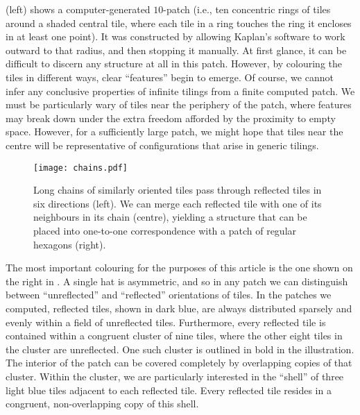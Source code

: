  (left) shows a computer-generated $10$-patch 
(i.e., ten concentric rings of tiles around a shaded central tile,
where each tile in a ring touches the ring it encloses in at least one 
point).  It was constructed by allowing Kaplan's software to work outward to
that radius, and then stopping it manually.
At first glance, it can be difficult to discern any
structure at all in this patch.  However, by colouring the tiles in different
ways, clear ``features'' begin to emerge.  Of course, we cannot infer any
conclusive properties of infinite tilings from a finite computed patch.
We must be particularly wary of tiles near the periphery of the patch,
where features may break down under the extra freedom afforded by
the proximity to empty space.  However, for a sufficiently large patch,
we might hope that tiles near the centre will be representative of 
configurations that arise in generic tilings.

\begin{figure}[htp!]
\begin{center}
\texttt{[image: chains.pdf]}
\end{center}
\caption{\label{fig:patch10col}
	Long chains of similarly oriented tiles pass through reflected tiles
	in six directions (left).  We can merge each reflected tile with one
	of its neighbours in its chain (centre), yielding a structure
	that can be placed into one-to-one correspondence with a patch of
	regular hexagons (right).}
\end{figure}

The most important colouring for the purposes of this article is the one shown
on the right in .  A single hat is asymmetric, 
and so in any patch we can distinguish between ``unreflected'' and 
``reflected'' orientations of tiles.  In the patches we computed,
reflected tiles, shown in dark blue, are always
distributed sparsely and evenly within a field of unreflected tiles.
Furthermore, every reflected tile is contained within a congruent cluster
of nine tiles, where the other eight tiles in the cluster are unreflected.
One such cluster is outlined in bold in the illustration.  The interior of
the patch can be covered completely by overlapping copies of that cluster.
Within the cluster, we are particularly interested in the ``shell'' of 
three light blue tiles adjacent to each reflected tile.  Every reflected tile
resides in a congruent, non-overlapping copy of this shell.

